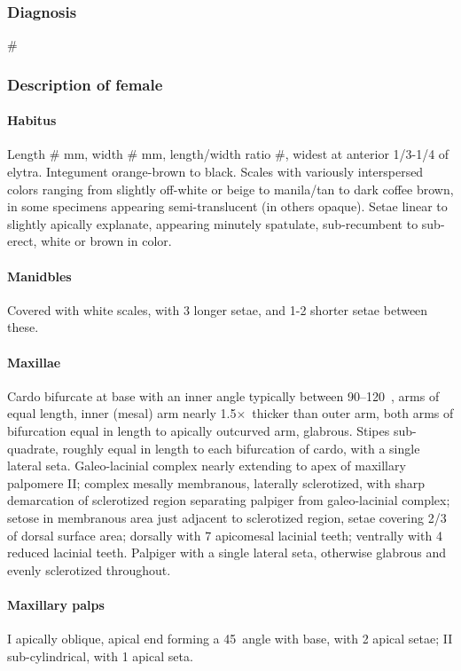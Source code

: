 \documentclass[fleqn,10pt,lineno]{wlpeerj} %
\newcommand{\td}{\textdegree~}
\newcommand{\x}{$\times$~}
\begin{document}
		\subsubsection*{Diagnosis}
			\#
		\subsubsection*{Description of female}
			\paragraph{Habitus}
				Length \# mm, width \# mm, length/width ratio \#, widest at anterior 1/3-1/4 of elytra.
				Integument orange-brown to black. 
				Scales with variously interspersed colors ranging from slightly off-white or beige to manila/tan to dark coffee brown, in some specimens appearing semi-translucent (in others opaque). 
				Setae linear to slightly apically explanate, appearing minutely spatulate, sub-recumbent to sub-erect, white or brown in color.
			\paragraph{Manidbles}
				Covered with white scales, with 3 longer setae, and 1-2 shorter setae between these.
			\paragraph{Maxillae}
				Cardo bifurcate at base with an inner angle typically between 90–120\td, arms of equal length, inner (mesal) arm nearly 1.5\x thicker than outer arm, both arms of bifurcation equal in length to apically outcurved arm, glabrous. 
				Stipes sub-quadrate, roughly equal in length to each bifurcation of cardo, with a single lateral seta. 
				Galeo-lacinial complex nearly extending to apex of maxillary palpomere II; complex mesally membranous, laterally sclerotized, with sharp demarcation of sclerotized region separating palpiger from galeo-lacinial complex; setose in membranous area just adjacent to sclerotized
region, setae covering 2/3 of dorsal surface area; dorsally with 7 apicomesal lacinial teeth; ventrally with 4 reduced lacinial teeth. 
				Palpiger with a single lateral seta, otherwise glabrous and evenly sclerotized throughout.
			\paragraph{Maxillary palps}
				I apically oblique, apical end forming a 45\td angle with base, with 2 apical setae; II sub-cylindrical, with 1 apical seta.
\end{document}
